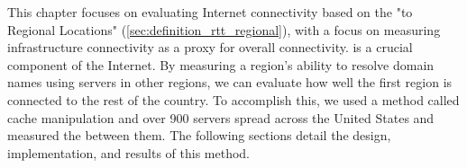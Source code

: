 This chapter focuses on evaluating Internet connectivity based on the "\rtt to Regional Locations" (\cref{sec:definition_rtt_regional}), with a focus on measuring \dns infrastructure connectivity as a proxy for overall connectivity. \dns is a crucial component of the Internet. By measuring a region's ability to resolve domain names using servers in other regions, we can evaluate how well the first region is connected to the rest of the country. To accomplish this, we used a method called \dns cache manipulation and over 900 \dns servers spread across the United States and measured the \rtt between them. The following sections detail the design, implementation, and results of this method.